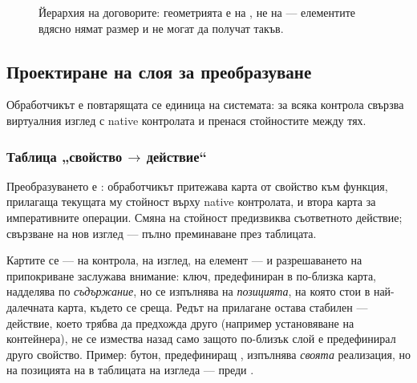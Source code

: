 \begin{figure}[H]
\centering
{}
\caption{Йерархия на договорите: геометрията е на , не на 
--- елементите вдясно нямат размер и не могат да получат такъв.}
\label{fig:contracts}
\end{figure}

\subsection{Проектиране на слоя за преобразуване}
\label{subsec:handler_design}

Обработчикът е повтарящата се единица на системата: за всяка контрола свързва виртуалния
изглед с native контролата и пренася стойностите между тях.

\subsubsection{Таблица „свойство\,$\rightarrow$\,действие“}

Преобразуването е : обработчикът притежава карта от свойство към функция,
прилагаща текущата му стойност върху native контролата, и втора карта за императивните
операции. Смяна на стойност предизвиква съответното действие; свързване на нов изглед ---
пълно преминаване през таблицата.

Картите се  --- на контрола, на изглед, на елемент --- и разрешаването на
припокриване заслужава внимание: ключ, предефиниран в по-близка карта, надделява по
\emph{съдържание}, но се изпълнява на \emph{позицията}, на която стои в най-далечната
карта, където се среща. Редът на прилагане остава стабилен --- действие, което трябва да
предхожда друго (например установяване на контейнера), не се измества назад само защото
по-близък слой е предефинирал друго свойство. Пример: бутон, предефиниращ
, изпълнява \emph{своята} реализация, но на позицията на
 в таблицата на изгледа --- преди .

